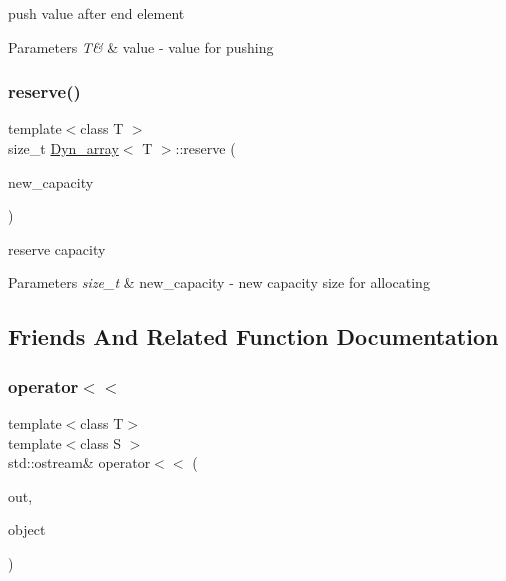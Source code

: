 push value after end element 


\begin{DoxyParams}{Parameters}
{\em T\&} & value -\/ value for pushing \\
\hline
\end{DoxyParams}
\mbox{\label{classDyn__array_a8cc1e876bc20ce13490898be4bdd7882}} 
\subsubsection{\texorpdfstring{reserve()}{reserve()}}
{\footnotesize\ttfamily template$<$class T $>$ \\
size\+\_\+t \hyperlink{classDyn__array}{Dyn\+\_\+array}$<$ T $>$\+::reserve (\begin{DoxyParamCaption}\item[{const size\+\_\+t}]{new\+\_\+capacity }\end{DoxyParamCaption})}



reserve capacity 


\begin{DoxyParams}{Parameters}
{\em size\+\_\+t} & new\+\_\+capacity -\/ new capacity size for allocating \\
\hline
\end{DoxyParams}


\subsection{Friends And Related Function Documentation}
\mbox{\label{classDyn__array_aebc2873551e997f690220158398e5bf3}} 
\subsubsection{\texorpdfstring{operator$<$$<$}{operator<<}}
{\footnotesize\ttfamily template$<$class T$>$ \\
template$<$class S $>$ \\
std\+::ostream\& operator$<$$<$ (\begin{DoxyParamCaption}\item[{std\+::ostream \&}]{out,  }\item[{const \hyperlink{classDyn__array}{Dyn\+\_\+array}$<$ S $>$ \&}]{object }\end{DoxyParamCaption})\hspace{0.3cm}{\ttfamily [friend]}}



